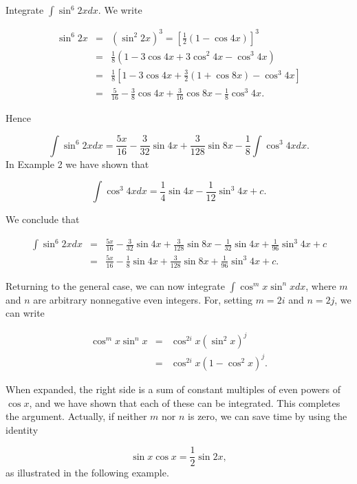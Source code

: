 \begin{example}
Integrate $\int \sin^{6}2x dx$. We write 

\begin{eqnarray*}
\sin^{6}2x 
&=& (\sin^{2} 2x)^3 = [\frac{1}{2}(1 - \cos4x)]^3\\ 
&=& \frac{1}{8}(1 - 3 \cos 4x + 3 \cos^{2}4x - \cos^{3} 4x)\\ 
&=&  \frac{1}{8} [ 1 - 3 \cos 4x + \frac{3}{2} ( 1 + \cos 8x) - \cos^{3} 4x] \\
&=& \frac{5}{16} - \frac{3}{8} \cos4x + \frac{3}{16} \cos 8x - \frac{1}{8} \cos^{3}4x. 
\end{eqnarray*}

\noindent Hence

$$
\int \sin^{6}2x dx = \frac{5x}{16} - \frac{3}{32} \sin 4x + \frac{3}{128} \sin 8x 
- \frac{1}{8} \int \cos^{3} 4x dx.
$$
\noindent In Example 2 we have shown that

$$
\int \cos^{3}4x dx = \frac{1}{4} \sin 4x - \frac{1}{12} \sin^{3} 4x + c.
$$

\noindent We conclude that 

\begin{eqnarray*}
\int \sin^{6}2x dx &=& \frac{5x}{16} - \frac{3}{32} \sin 4x + \frac{3}{128} \sin 8x - \frac{1}{32} \sin 4x + \frac{1}{96} \sin^{3}4x + c \\
&=& \frac{5x}{16} - \frac{1}{8} \sin 4x + \frac{3}{128} \sin 8x + \frac{1}{96} \sin^{3}4x + c.
\end{eqnarray*}
\end{example}

Returning to the general case, we can now integrate $\int \cos^{m}x \sin^{n}xdx$, where $m$ and $n$ are arbitrary nonnegative even integers. For, setting $m = 2i$ and $n = 2j$, we can write

\begin{eqnarray*}
\cos^{m}x \sin^{n}x &=& \cos^{2i} x (\sin^{2} x)^j \\
                               &=& \cos^{2i} x(1 - \cos^{2} x)^j.
\end{eqnarray*}

\noindent When expanded, the right side is a sum of constant multiples of even powers of 
$\cos x$, and we have shown that each of these can be integrated. This completes the argument. Actually, if neither $m$ nor $n$ is zero, we can save time by using the identity 

$$
\sin x \cos x = \frac{1}{2} \sin 2x, 
$$
\noindent as illustrated in the following example.


